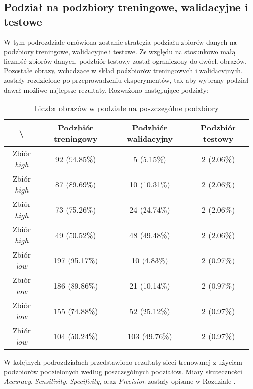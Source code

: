 \newpage
\subsection{Podział na podzbiory treningowe, walidacyjne i testowe}
\label{sec:podzial}
W tym podrozdziale omówiona zostanie strategia podziału zbiorów danych na podzbiory treningowe, walidacyjne i testowe.
Ze względu na stosunkowo małą liczność zbiorów danych, podzbiór testowy został ograniczony do dwóch obrazów.
Pozostałe obrazy, wchodzące w skład podzbiorów treningowych i walidacyjnych, zostały rozdzielone po przeprowadzeniu eksperymentów, tak aby wybrany podział dawał możliwe najlepsze rezultaty.
Rozważono następujące podziały:

\begin{table}[!h]
	\centering
	\caption{Liczba obrazów w podziale na poszczególne podzbiory}
	\vspace{6pt}
	{\footnotesize
		\begin{tabular}{|c|c|c|c|}
			\hline \textbackslash & Podzbiór treningowy & Podzbiór walidacyjny & Podzbiór testowy \\
      \hline Zbiór \textit{high} & 92 (94.85\%) & 5 (5.15\%) & 2 (2.06\%) \\
      \hline Zbiór \textit{high} & 87 (89.69\%) & 10 (10.31\%) & 2 (2.06\%) \\
      \hline Zbiór \textit{high} & 73 (75.26\%) & 24 (24.74\%) & 2 (2.06\%) \\
      \hline Zbiór \textit{high} & 49 (50.52\%) & 48 (49.48\%) & 2 (2.06\%) \\
      \hline Zbiór \textit{low} & 197 (95.17\%) & 10 (4.83\%) & 2 (0.97\%) \\
      \hline Zbiór \textit{low} & 186 (89.86\%) & 21 (10.14\%) & 2 (0.97\%) \\
      \hline Zbiór \textit{low} & 155 (74.88\%) & 52 (25.12\%) & 2 (0.97\%) \\
      \hline Zbiór \textit{low} & 104 (50.24\%) & 103 (49.76\%) & 2 (0.97\%) \\
      \hline
		\end{tabular}
	}
	\vspace{0pt}
\end{table}


W kolejnych podrozdziałach przedstawiono rezultaty sieci trenowanej z użyciem podzbiorów podzielonych według poszczególnych podziałów.
Miary skuteczności \textit{Accuracy}, \textit{Sensitivity}, \textit{Specificity}, oraz \textit{Precision} zostały opisane w Rozdziale .
